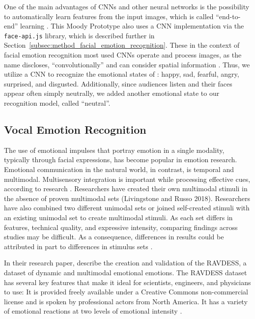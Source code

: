 One of the main advantages of CNNs and other neural networks is the possibility to automatically learn features from the input images, which is called ``end-to-end'' learning \cite{ko_brief_2018}. This Moody Prototype also uses a CNN implementation via the \texttt{face-api.js} library, which is described further in Section~\ref{subsec:method_facial_emotion_recognition}. These in the context of facial emotion recognition most used CNNs operate and process images, as the name discloses, ``convolutionally'' and can consider spatial information \cite{ko_brief_2018, rosler_reducing_2021}. Thus, we utilize a CNN to recognize the emotional states of : happy, sad, fearful, angry, surprised, and disgusted. Additionally, since audiences listen and their faces appear often simply neutrally, we added another emotional state to our recognition model, called ``neutral''.

\subsection{Vocal Emotion Recognition}
\label{subsec:related_work_vocal_emotion_recognition}
The use of emotional impulses that portray emotion in a single modality, typically through facial expressions, has become popular in emotion research. Emotional communication in the natural world, in contrast, is temporal and multimodal. Multisensory integration is important while processing effective cues, according to research \cite{livingstone_ryerson_2018}. Researchers have created their own multimodal stimuli in the absence of proven multimodal sets (Livingstone and Russo 2018). Researchers have also combined two different unimodal sets \cite{delle-vigne_subclinical_2014} or joined self-created stimuli with an existing unimodal set \cite{zvyagintsev_attention_2013} to create multimodal stimuli. As each set differs in features, technical quality, and expressive intensity, comparing findings across studies may be difficult. As a consequence, differences in results could be attributed in part to differences in stimulus sets \cite{livingstone_ryerson_2018}.

In their research paper,  describe the creation and validation of the RAVDESS, a dataset of dynamic and multimodal emotional emotions. The RAVDESS dataset has several key features that make it ideal for scientists, engineers, and physicians to use: It is provided freely available under a Creative Commons non-commercial license and is spoken by professional actors from North America. It has a variety of emotional reactions at two levels of emotional intensity \cite{livingstone_ryerson_2018}. 

